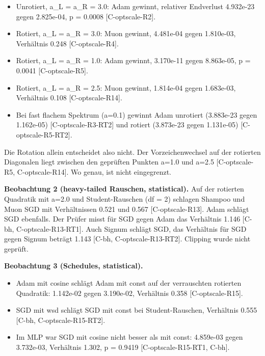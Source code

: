 \documentclass[10pt,twocolumn]{article}
\begin{document}
\begin{itemize}
\item Unrotiert, a_L = a_R = 3.0: Adam gewinnt, relativer Endverlust 4.932e-23 gegen 2.825e-04, p = 0.0008 {\scriptsize[C-optscale-R2]}.
\item Rotiert, a_L = a_R = 3.0: Muon gewinnt, 4.481e-04 gegen 1.810e-03, Verhältnis 0.248 {\scriptsize[C-optscale-R4]}.
\item Rotiert, a_L = a_R = 1.0: Adam gewinnt, 3.170e-11 gegen 8.863e-05, p = 0.0041 {\scriptsize[C-optscale-R5]}.
\item Rotiert, a_L = a_R = 2.5: Muon gewinnt, 1.814e-04 gegen 1.683e-03, Verhältnis 0.108 {\scriptsize[C-optscale-R14]}.
\item Bei fast flachem Spektrum (a=0.1) gewinnt Adam unrotiert (3.883e-23 gegen 1.162e-05) {\scriptsize[C-optscale-R3-RT2]} und rotiert (3.873e-23 gegen 1.131e-05) {\scriptsize[C-optscale-R5-RT2]}.
\end{itemize}

Die Rotation allein entscheidet also nicht. Der Vorzeichenwechsel auf der rotierten Diagonalen liegt zwischen den geprüften Punkten a=1.0 und a=2.5 {\scriptsize[C-optscale-R5, C-optscale-R14]}. Wo genau, ist nicht eingegrenzt.

\textbf{Beobachtung 2 (heavy-tailed Rauschen, statistical).} Auf der rotierten Quadratik mit a=2.0 und Student-Rauschen (df = 2) schlagen Shampoo und Muon SGD mit Verhältnissen 0.521 und 0.567 {\scriptsize[C-optscale-R13]}. Adam schlägt SGD ebenfalls. Der Prüfer misst für SGD gegen Adam das Verhältnis 1.146 {\scriptsize[C-bh, C-optscale-R13-RT1]}. Auch Signum schlägt SGD, das Verhältnis für SGD gegen Signum beträgt 1.143 {\scriptsize[C-bh, C-optscale-R13-RT2]}. Clipping wurde nicht geprüft.

\textbf{Beobachtung 3 (Schedules, statistical).}

\begin{itemize}
\item Adam mit cosine schlägt Adam mit const auf der verrauschten rotierten Quadratik: 1.142e-02 gegen 3.190e-02, Verhältnis 0.358 {\scriptsize[C-optscale-R15]}.
\item SGD mit wsd schlägt SGD mit const bei Student-Rauschen, Verhältnis 0.555 {\scriptsize[C-bh, C-optscale-R15-RT2]}.
\item Im MLP war SGD mit cosine nicht besser als mit const: 4.859e-03 gegen 3.732e-03, Verhältnis 1.302, p = 0.9419 {\scriptsize[C-optscale-R15-RT1, C-bh]}.
\end{itemize}
\end{document}
